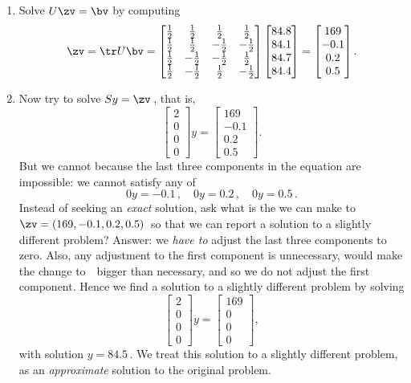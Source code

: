 \begin{example}
\begin{enumerate}
\item Solve \(U\zv=\bv\) by computing 
\begin{equation*}
\zv=\tr U\bv
=\begin{bmatrix} 
  \h&\h&\h&\h
\\\h&\h&-\h&-\h
\\\h&-\h&-\h&\h
\\\h&-\h&\h&-\h \end{bmatrix}
\begin{bmatrix} 84.8\\84.1\\84.7\\84.4 \end{bmatrix}
=\begin{bmatrix} 169\\-0.1\\0.2\\0.5 \end{bmatrix}.
\end{equation*}

\item  Now try to solve \(Sy=\zv\)\,, that is,
\begin{equation*}
\begin{bmatrix} 2\\0\\0\\0 \end{bmatrix}y
=\begin{bmatrix} 169\\-0.1\\0.2\\0.5 \end{bmatrix}.
\end{equation*}
But we cannot because the last three components in the equation are impossible: we cannot satisfy any of
\begin{equation*}
0y=-0.1\,,\quad
0y=0.2\,,\quad
0y=0.5\,.
\end{equation*}
Instead of seeking an \emph{exact} solution, ask what is the \emph{} we can make to~\(\zv=(169,-0.1,0.2,0.5)\)\ so that we can report a solution to a slightly different problem?
Answer: we \emph{have to} adjust the last three components to zero. 
Also, any adjustment to the first component is unnecessary, would make the change to~\zv\ bigger than necessary, and so we do not adjust the first component.
Hence we find a solution to a slightly different problem by solving
\begin{equation*}
\begin{bmatrix} 2\\0\\0\\0 \end{bmatrix}y
=\begin{bmatrix} 169\\0\\0\\0 \end{bmatrix},
\end{equation*}
with solution \(y=84.5\)\,.
We treat this solution to a slightly different problem, as an \emph{approximate} solution to the original problem.


\end{enumerate}
\end{example}
